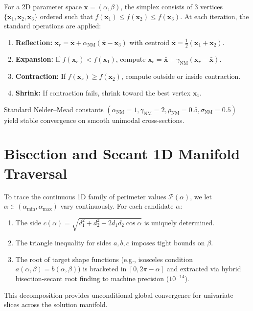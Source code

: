 For a 2D parameter space $\mathbf{x} = (\alpha, \beta)$, the simplex consists of 3 vertices $\{\mathbf{x}_1, \mathbf{x}_2, \mathbf{x}_3\}$ ordered such that $f(\mathbf{x}_1) \le f(\mathbf{x}_2) \le f(\mathbf{x}_3)$. At each iteration, the standard operations are applied:
\begin{enumerate}
    \item \textbf{Reflection:} $\mathbf{x}_r = \bar{\mathbf{x}} + \alpha_{\text{NM}} (\bar{\mathbf{x}} - \mathbf{x}_3)$ with centroid $\bar{\mathbf{x}} = \frac{1}{2}(\mathbf{x}_1 + \mathbf{x}_2)$.
    \item \textbf{Expansion:} If $f(\mathbf{x}_r) < f(\mathbf{x}_1)$, compute $\mathbf{x}_e = \bar{\mathbf{x}} + \gamma_{\text{NM}} (\mathbf{x}_r - \bar{\mathbf{x}})$.
    \item \textbf{Contraction:} If $f(\mathbf{x}_r) \ge f(\mathbf{x}_2)$, compute outside or inside contraction.
    \item \textbf{Shrink:} If contraction fails, shrink toward the best vertex $\mathbf{x}_1$.
\end{enumerate}
Standard Nelder--Mead constants $(\alpha_{\text{NM}}=1, \gamma_{\text{NM}}=2, \rho_{\text{NM}}=0.5, \sigma_{\text{NM}}=0.5)$ yield stable convergence on smooth unimodal cross-sections.

\section{Bisection and Secant 1D Manifold Traversal}
To trace the continuous 1D family of perimeter values $\mathcal{P}(\alpha)$, we let $\alpha \in (\alpha_{\min}, \alpha_{\max})$ vary continuously. For each candidate $\alpha$:
\begin{enumerate}
    \item The side $c(\alpha) = \sqrt{d_1^2 + d_2^2 - 2d_1 d_2 \cos \alpha}$ is uniquely determined.
    \item The triangle inequality for sides $a, b, c$ imposes tight bounds on $\beta$.
    \item The root of target shape functions (e.g., isosceles condition $a(\alpha, \beta) = b(\alpha, \beta)$) is bracketed in $[0, 2\pi - \alpha]$ and extracted via hybrid bisection-secant root finding to machine precision ($10^{-14}$).
\end{enumerate}

This decomposition provides unconditional global convergence for univariate slices across the solution manifold.
